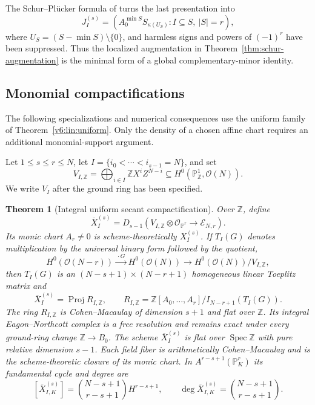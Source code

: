 \documentclass[10pt,fleqn]{article}
\numberwithin{equation}{section}
\newtheorem{theorem}{Theorem}[section]
\newcommand{\PP}{\mathbb P}
\newcommand{\cE}{\mathcal E}
\begin{document}
The Schur--Pl\"ucker formula of \cite{LiYuanSchur} turns the last presentation into
\begin{equation}\label{eq:global-Schur-augmentation}
 J_I^{(s)}=
 \left(
 A_0^{\min S}S_{\kappa(U_S)}:
 I\subseteq S,\ |S|=r
 \right),
\end{equation}
where $U_S=(S-\min S)\setminus\{0\}$, and harmless signs and powers of $(-1)^r$
have been suppressed.  Thus the localized
augmentation in Theorem~\ref{thm:schur-augmentation} is the minimal form of a global
complementary-minor identity.

\subsection{Monomial compactifications}

The following specializations and numerical consequences use the
uniform family of Theorem~\ref{v6:lin:uniform}.  Only the density of a
chosen affine chart requires an additional monomial-support argument.

Let $1\le s\le r\le N$, let $I=\{i_0<\cdots<i_{s-1}=N\}$, and set
\begin{equation}\label{eq:monomial-linear-series}
 V_{I,\mathbb Z}=\bigoplus_{i\in I}\mathbb Z X^iZ^{N-i}
 \subseteq H^0(\PP^1_{\mathbb Z},\mathcal O(N)).
\end{equation}
We write $V_I$ after the ground ring has been specified.  \begin{theorem}[Integral uniform secant compactification]\label{thm:secant-compactification}
Over $\mathbb Z$, define
\begin{equation}\label{eq:projective-secant-locus}
 \overline X_I^{(s)}=
 D_{s-1}\left(V_{I,\mathbb Z}\otimes\mathcal O_{\PP^r}
 \longrightarrow\cE_{N,r}\right).
\end{equation}
Its monic chart $A_r\ne0$ is scheme-theoretically $X_I^{(s)}$.  If $T_I(G)$
denotes multiplication by the universal binary form followed by the quotient,
\[
 H^0(\mathcal O(N-r))\xrightarrow{\,\cdot G\,}
 H^0(\mathcal O(N))\longrightarrow H^0(\mathcal O(N))/V_{I,\mathbb Z},
\]
then $T_I(G)$ is an $(N-s+1)\times(N-r+1)$ homogeneous linear Toeplitz matrix and
\begin{equation}\label{eq:projective-Toeplitz}
 \overline X_I^{(s)}=\operatorname{Proj}R_{I,\mathbb Z},\qquad
 R_{I,\mathbb Z}=
 \mathbb Z[A_0,\ldots,A_r]/I_{N-r+1}(T_I(G)).
\end{equation}
The ring $R_{I,\mathbb Z}$ is Cohen--Macaulay of dimension $s+1$ and flat over
$\mathbb Z$.  Its integral Eagon--Northcott complex is a free resolution and
remains exact under every ground-ring change $\mathbb Z\to B_0$.
The scheme $\overline X_I^{(s)}$ is flat over $\operatorname{Spec}\mathbb Z$
with pure relative dimension $s-1$.  Each field fiber is arithmetically
Cohen--Macaulay and is the scheme-theoretic closure of its monic chart.
In $A^{r-s+1}(\PP^r_K)$ its fundamental cycle and degree are
\begin{equation}\label{eq:universal-projective-degree}
 [\overline X_{I,K}^{(s)}]
 =\binom{N-s+1}{r-s+1}H^{r-s+1},\qquad
 \deg\overline X_{I,K}^{(s)}=\binom{N-s+1}{r-s+1}.
\end{equation}
\end{theorem}
\end{document}
